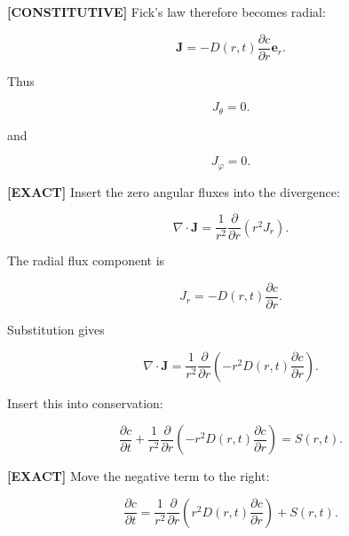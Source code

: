 \documentclass[11pt,a4paper]{article}
\begin{document}
\textbf{[CONSTITUTIVE]} Fick's law therefore becomes radial:

\begin{equation}
\boxed{\mathbf J=-D(r,t)\frac{\partial c}{\partial r}\mathbf e_r.}
\tag{TRISO-SPH-026}
\label{eq:triso-sph-026}
\end{equation}

Thus

\begin{equation}
J_\theta=0.
\tag{TRISO-SPH-027}
\label{eq:triso-sph-027}
\end{equation}

and

\begin{equation}
J_\varphi=0.
\tag{TRISO-SPH-028}
\label{eq:triso-sph-028}
\end{equation}

\textbf{[EXACT]} Insert the zero angular fluxes into the divergence:

\begin{equation}
\nabla\cdot\mathbf J=\frac1{r^2}\frac{\partial}{\partial r}(r^2J_r).
\tag{TRISO-SPH-029}
\label{eq:triso-sph-029}
\end{equation}

The radial flux component is

\begin{equation}
J_r=-D(r,t)\frac{\partial c}{\partial r}.
\tag{TRISO-SPH-030}
\label{eq:triso-sph-030}
\end{equation}

Substitution gives

\begin{equation}
\nabla\cdot\mathbf J=\frac1{r^2}\frac{\partial}{\partial r}\left(-r^2D(r,t)\frac{\partial c}{\partial r}\right).
\tag{TRISO-SPH-031}
\label{eq:triso-sph-031}
\end{equation}

Insert this into conservation:

\begin{equation}
\frac{\partial c}{\partial t}+\frac1{r^2}\frac{\partial}{\partial r}\left(-r^2D(r,t)\frac{\partial c}{\partial r}\right)=S(r,t).
\tag{TRISO-SPH-032}
\label{eq:triso-sph-032}
\end{equation}

\textbf{[EXACT]} Move the negative term to the right:

\begin{equation}
\boxed{\frac{\partial c}{\partial t}=\frac1{r^2}\frac{\partial}{\partial r}\left(r^2D(r,t)\frac{\partial c}{\partial r}\right)+S(r,t).}
\tag{TRISO-SPH-033}
\label{eq:triso-sph-033}
\end{equation}
\end{document}
